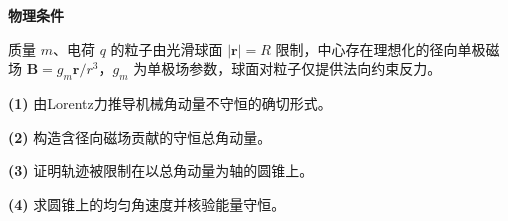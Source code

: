 \textbf{物理条件}\par 质量 \(m\)、电荷 \(q\) 的粒子由光滑球面 \(|\boldsymbol r|=R\) 限制，中心存在理想化的径向单极磁场 \(\boldsymbol B=g_m\boldsymbol r/r^3\)，\(g_m\) 为单极场参数，球面对粒子仅提供法向约束反力。
\par\noindent\textbf{(1)} 由Lorentz力推导机械角动量不守恒的确切形式。
\par\noindent\textbf{(2)} 构造含径向磁场贡献的守恒总角动量。
\par\noindent\textbf{(3)} 证明轨迹被限制在以总角动量为轴的圆锥上。
\par\noindent\textbf{(4)} 求圆锥上的均匀角速度并核验能量守恒。
